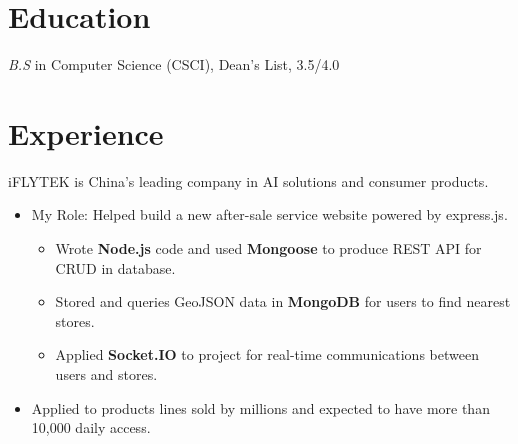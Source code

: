 \documentclass{resume}
\begin{document}



\section{Education}
\textit{B.S} in Computer Science (CSCI), Dean's List, 3.5/4.0

\section{Experience}
  iFLYTEK is China's leading company in AI solutions and consumer products.
\begin{itemize}
  \item My Role: Helped build a new after-sale service website powered by express.js.
  \begin{itemize}
    \item Wrote \textbf{Node.js} code and used \textbf{Mongoose} to produce REST API for CRUD in database.
    \item Stored and queries GeoJSON data in \textbf{MongoDB} for users to find nearest stores.
    \item Applied \textbf{Socket.IO} to project for real-time communications between users and stores.
  \end{itemize}
  \item Applied to products lines sold by millions and expected to have more than 10,000 daily access.
\end{itemize}
\end{document}
